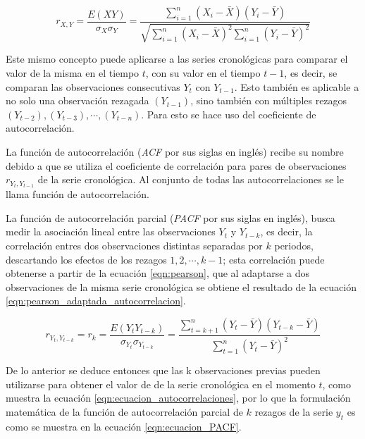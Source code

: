 \documentclass[
]{article}
\begin{document}
\begin{equation}
\label{eqn:pearson}
r_{X,Y}=\frac{E(XY)}{\sigma_X \sigma_Y} = \frac{\sum_{i=1}^n \left(X_i- \bar X\right) \left(Y_i- \bar Y\right)}{\sqrt{\sum_{i=1}^n \left(X_i- \bar X\right)^2 \sum_{i=1}^n \left(Y_i- \bar Y\right)^2}}
\end{equation}

Este mismo concepto puede aplicarse a las series cronológicas para
comparar el valor de la misma en el tiempo \(t\), con su valor en el
tiempo \(t-1\), es decir, se comparan las observaciones consecutivas
\(Y_t\) con \(Y_{t-1}\). Esto también es aplicable a no solo una
observación rezagada \((Y_{t-1})\), sino también con múltiples rezagos
\((Y_{t-2}), (Y_{t-3}), \cdots,(Y_{t-n})\). Para esto se hace uso del
coeficiente de autocorrelación.

La función de autocorrelación (\emph{ACF} por sus siglas en inglés)
recibe su nombre debido a que se utiliza el coeficiente de correlación
para pares de observaciones \(r_{Y_t, Y_{t-1}}\) de la serie
cronológica. Al conjunto de todas las autocorrelaciones se le llama
función de autocorrelación.

La función de autocorrelación parcial (\emph{PACF} por sus siglas en
inglés), busca medir la asociación lineal entre las observaciones
\(Y_t\) y \(Y_{t-k}\), es decir, la correlación entres dos observaciones
distintas separadas por \(k\) periodos, descartando los efectos de los
rezagos \(1,2, \cdots ,k-1\); esta correlación puede obtenerse a partir
de la ecuación \eqref{eqn:pearson}, que al adaptarse a dos observaciones
de la misma serie cronológica se obtiene el resultado de la ecuación
\eqref{eqn:pearson_adaptada_autocorrelacion}.

\begin{equation}
\label{eqn:pearson_adaptada_autocorrelacion}
r_{{Y_t},{Y_{t-k}}} = r_k = \frac{E({Y_t}{Y_{t-k}})}{\sigma_{Y_t} \sigma_{Y_{t-k}}} = \frac{\sum_{t=k+1}^n \left({Y_t} - \bar{Y} \right) \left({Y_{t-k}} - \bar{Y}\right)}{ \sum_{t=1}^n \left({Y_t} - \bar{Y} \right)^2}
\end{equation}

De lo anterior se deduce entonces que las k observaciones previas pueden
utilizarse para obtener el valor de de la serie cronológica en el
momento \(t\), como muestra la ecuación
\eqref{eqn:ecuacion_autocorrelaciones}, por lo que la formulación
matemática de la función de autocorrelación parcial de \(k\) rezagos de
la serie \(y_t\) es como se muestra en la ecuación
\eqref{eqn:ecuacion_PACF}.
\end{document}
